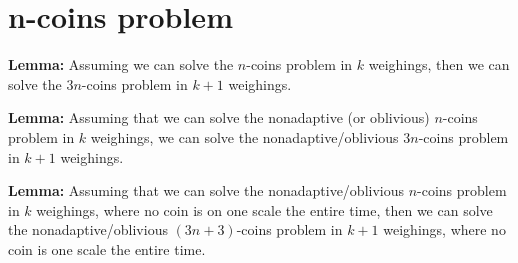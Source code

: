 \section{n-coins problem}

\textbf{Lemma:} Assuming we can solve the $n$-coins problem in $k$ weighings, then we can solve the $3n$-coins problem in $k+1$ weighings.

\textbf{Lemma:} Assuming that we can solve the nonadaptive (or oblivious) $n$-coins problem in $k$ weighings, we can solve the nonadaptive/oblivious $3n$-coins problem in $k+1$ weighings.

\textbf{Lemma:} Assuming that we can solve the nonadaptive/oblivious $n$-coins problem in $k$ weighings, where no coin is on one scale the entire time, then we can solve the nonadaptive/oblivious $(3n+3)$-coins problem in $k+1$ weighings, where no coin is one scale the entire time.
